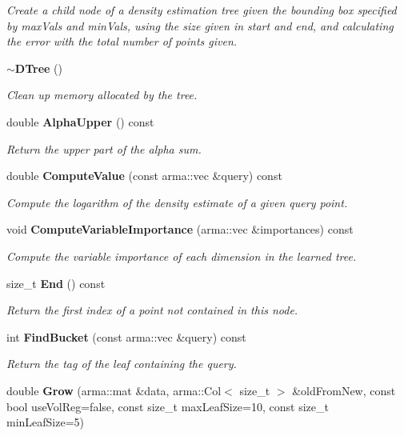 \begin{DoxyCompactItemize}
\begin{DoxyCompactList}\small\item\em Create a child node of a density estimation tree given the bounding box specified by max\-Vals and min\-Vals, using the size given in start and end, and calculating the error with the total number of points given. \end{DoxyCompactList}\item 
{\bf $\sim$\-D\-Tree} ()
\begin{DoxyCompactList}\small\item\em Clean up memory allocated by the tree. \end{DoxyCompactList}\item 
double {\bf Alpha\-Upper} () const 
\begin{DoxyCompactList}\small\item\em Return the upper part of the alpha sum. \end{DoxyCompactList}\item 
double {\bf Compute\-Value} (const arma\-::vec \&query) const 
\begin{DoxyCompactList}\small\item\em Compute the logarithm of the density estimate of a given query point. \end{DoxyCompactList}\item 
void {\bf Compute\-Variable\-Importance} (arma\-::vec \&importances) const 
\begin{DoxyCompactList}\small\item\em Compute the variable importance of each dimension in the learned tree. \end{DoxyCompactList}\item 
size\-\_\-t {\bf End} () const 
\begin{DoxyCompactList}\small\item\em Return the first index of a point not contained in this node. \end{DoxyCompactList}\item 
int {\bf Find\-Bucket} (const arma\-::vec \&query) const 
\begin{DoxyCompactList}\small\item\em Return the tag of the leaf containing the query. \end{DoxyCompactList}\item 
double {\bf Grow} (arma\-::mat \&data, arma\-::\-Col$<$ size\-\_\-t $>$ \&old\-From\-New, const bool use\-Vol\-Reg=false, const size\-\_\-t max\-Leaf\-Size=10, const size\-\_\-t min\-Leaf\-Size=5)

\end{DoxyCompactItemize}
